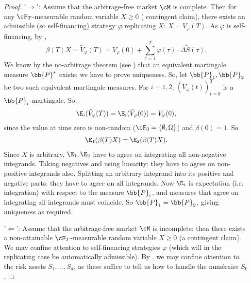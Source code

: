 \begin{proof}
	'$\Rightarrow$': Assume that the arbitrage-free market $\cM$ is complete. Then for any $\cF_T$-measurable random variable $X \geq 0$ ( contingent claim), there exists an admissible (so self-financing) strategy $\varphi$ replicating $X$: $X = V_{\varphi}(T)$. As $\varphi$ is self-financing, by ,
	\begin{equation}
		\beta(T)X = \tilde{V}_{\varphi}(T) = V_{\varphi}(0) + \sum_{\tau=1}^{T} \varphi(\tau) \cdot \Delta \tilde{S}(\tau).
	\end{equation}
	We know by the no-arbitrage theorem (see ) that an equivalent martingale measure $\bb{P}^*$ exists; we have to prove uniqueness. So, let $\bb{P}_1, \bb{P}_2$ be two such equivalent martingale measures. For $i = 1, 2$, $(\tilde{V}_{\varphi}(t))_{t=0}^T$ is a $\bb{P}_i$-martingale. So,
	\begin{equation}
		\E_i(\tilde{V}_{\varphi}(T)) = \E_i(\tilde{V}_{\varphi}(0)) = V_{\varphi}(0),
	\end{equation}
	since the value at time zero is non-random ($\cF_0 = \{\emptyset, \Omega\}$) and $\beta(0) = 1$. So
	\begin{equation}
		\E_1(\beta(T)X) = \E_2(\beta(T)X).
	\end{equation}
	Since $X$ is arbitrary, $\E_1, \E_2$ have to agree on integrating all non-negative integrands. Taking negatives and using linearity: they have to agree on non-positive integrands also. Splitting an arbitrary integrand into its positive and negative parts: they have to agree on all integrands. Now $\E_i$ is expectation (i.e. integration) with respect to the measure $\bb{P}_i$, and measures that agree on integrating all integrands must coincide. So $\bb{P}_1 = \bb{P}_2$, giving uniqueness as required.

	'$\Leftarrow$': Assume that the arbitrage-free market $\cM$ is incomplete: then there exists a non-attainable $\cF_T$-measurable random variable $X \geq 0$ (a contingent claim). We may confine attention to self-financing strategies $\varphi$ (which will in the replicating case be automatically admissible). By , we may confine attention to the risk assets $S_1, \dots, S_d$, as these suffice to tell us how to handle the num\'eraire $S_0$.


\end{proof}
